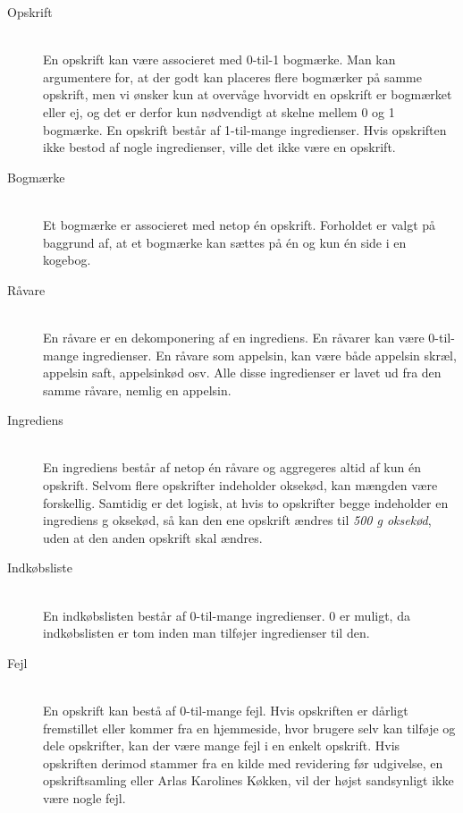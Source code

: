 \begin{description}
\item[Opskrift] \hfill \\
En opskrift kan være associeret med 0-til-1 bogmærke. Man kan argumentere for, at der godt kan placeres flere bogmærker på samme opskrift, men vi ønsker kun at overvåge hvorvidt en opskrift er bogmærket eller ej, og det er derfor kun nødvendigt at skelne mellem 0 og 1 bogmærke. En opskrift består af 1-til-mange ingredienser. Hvis opskriften ikke bestod af nogle ingredienser, ville det ikke være en opskrift.
    
\item[Bogmærke] \hfill \\
Et bogmærke er associeret med netop én opskrift. Forholdet er valgt på baggrund af, at et bogmærke kan sættes på én og kun én side i en kogebog.

\item[Råvare] \hfill \\
En råvare er en dekomponering af en ingrediens. En råvarer kan være 0-til-mange ingredienser. En råvare som \fx appelsin, kan være både appelsin skræl, appelsin saft, appelsinkød osv. Alle disse ingredienser er lavet ud fra den samme råvare, nemlig en appelsin. 

\item[Ingrediens] \hfill \\
En ingrediens består af netop én råvare og aggregeres altid af kun én opskrift. Selvom flere opskrifter indeholder oksekød, kan mængden være forskellig. Samtidig er det logisk, at hvis to opskrifter begge indeholder en ingrediens  g oksekød, så kan den ene opskrift ændres til \textit{500 g oksekød}, uden at den anden opskrift skal ændres.
  
\item[Indkøbsliste] \hfill \\
En indkøbslisten består af 0-til-mange ingredienser. 0 er muligt, da indkøbslisten er tom inden man tilføjer ingredienser til den.

\item[Fejl] \hfill \\
En opskrift kan bestå af 0-til-mange fejl. Hvis opskriften er dårligt fremstillet eller kommer fra en hjemmeside, hvor brugere selv kan tilføje og dele opskrifter, kan der \fx være mange fejl i en enkelt opskrift. Hvis opskriften derimod stammer fra en kilde med revidering før udgivelse, \fx en opskriftsamling eller Arlas Karolines Køkken, vil der højst sandsynligt ikke være nogle fejl.

\end{description}

